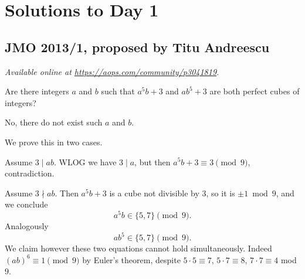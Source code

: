 \documentclass[11pt]{scrartcl}
\begin{document}
\section{Solutions to Day 1}
\subsection{JMO 2013/1, proposed by Titu Andreescu}
\textsl{Available online at \url{https://aops.com/community/p3041819}.}
\begin{mdframed}[style=mdpurplebox,frametitle={Problem statement}]
Are there integers $a$ and $b$
such that $a^5b+3$ and $ab^5+3$
are both perfect cubes of integers?
\end{mdframed}
No, there do not exist such $a$ and $b$.

We prove this in two cases.
\begin{itemize}
  \ii Assume $3 \mid ab$.
  WLOG we have $3 \mid a$,
  but then $a^5b+3 \equiv 3 \pmod 9$, contradiction.

  \ii Assume $3 \nmid ab$.
  Then $a^5b+3$ is a cube not divisible by $3$,
  so it is $\pm 1 \bmod 9$,
  and we conclude
  \[ a^5b \in \{5,7\} \pmod 9. \]
  Analogously \[ ab^5 \in \{5,7\} \pmod 9. \]
  We claim however these two equations cannot hold simultaneously.
  Indeed $(ab)^6 \equiv 1 \pmod 9$ by Euler's theorem,
  despite $5 \cdot 5 \equiv 7$, $5 \cdot 7 \equiv 8$,
  $7 \cdot 7 \equiv 4$ mod $9$.
\end{itemize}
\pagebreak
\end{document}

